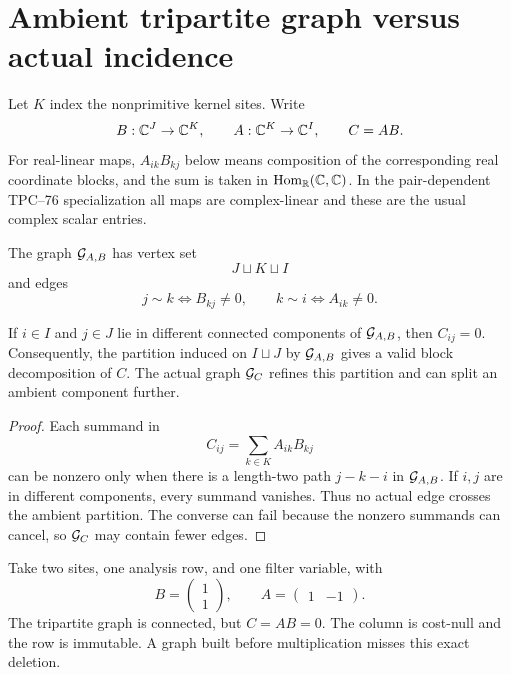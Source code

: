 \section{Ambient tripartite graph versus actual incidence}
\label{sec:ambient-graph}

Let \(K\) index the nonprimitive kernel sites. Write
\[
 B:\mathbb C^J\to\mathbb C^K,\qquad
 A:\mathbb C^K\to\mathbb C^I,\qquad
 C=AB.
\]
For real-linear maps, \(A_{ik}B_{kj}\) below means composition of the
corresponding real coordinate blocks, and the sum is taken in
\(\operatorname{Hom}_{\mathbb R}(\mathbb C,\mathbb C)\). In the pair-dependent
TPC--76 specialization all maps are complex-linear and these are the
usual complex scalar entries.

\begin{definition}
\label{def:tripartite}
The graph \(\mathcal G_{A,B}\) has vertex set
\[
 J\sqcup K\sqcup I
\]
and edges
\[
 j\sim k\iff B_{kj}\ne0,
 \qquad
 k\sim i\iff A_{ik}\ne0.
\]
\end{definition}

\begin{theorem}
\label{thm:ambient-refinement}
If \(i\in I\) and \(j\in J\) lie in different connected components of
\(\mathcal G_{A,B}\), then \(C_{ij}=0\). Consequently, the partition induced
on \(I\sqcup J\) by \(\mathcal G_{A,B}\) gives a valid block decomposition of
\(C\). The actual graph \(\mathcal G_C\) refines this partition and can split
an ambient component further.
\end{theorem}

\begin{proof}
Each summand in
\[
 C_{ij}
 =
 \sum_{k\in K}A_{ik}B_{kj}
\]
can be nonzero only when there is a length-two path
\(j-k-i\) in \(\mathcal G_{A,B}\). If \(i,j\) are in different components,
every summand vanishes. Thus no actual edge crosses the ambient
partition. The converse can fail because the nonzero summands can
cancel, so \(\mathcal G_C\) may contain fewer edges.
\end{proof}

\begin{example}
\label{ex:ambient-cancellation}
Take two sites, one analysis row, and one filter variable, with
\[
 B=
 \begin{pmatrix}1\\1\end{pmatrix},
 \qquad
 A=
 \begin{pmatrix}1&-1\end{pmatrix}.
\]
The tripartite graph is connected, but \(C=AB=0\). The column is
cost-null and the row is immutable. A graph built before multiplication
misses this exact deletion.
\end{example}

